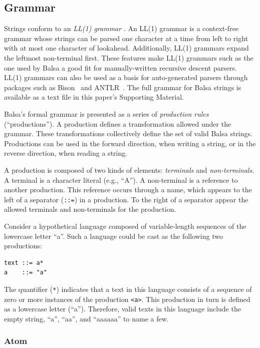 \documentclass{article}
\def\ttt{\texttt}
\begin{document}
\subsection*{Grammar}

Strings conform to an \textit{LL(1) grammar} \cite{thain:2020}. An LL(1) grammar is a context-free grammar whose strings can be parsed one character at a time from left to right with at most one character of lookahead. Additionally, LL(1) grammars expand the leftmost non-terminal first. These features make LL(1) grammars such as the one used by Balsa a good fit for manually-written recursive descent parsers. LL(1) grammars can also be used as a basis for auto-generated parsers through packages such as Bison~\cite{bison} and ANTLR~\cite{parr:2014}. The full grammar for Balsa strings is available as a text file in this paper's Supporting Material.

Balsa's formal grammar is presented as a series of \textit{production rules} (\enquote{productions}). A production defines a transformation allowed under the grammar. These transformations collectively define the set of valid Balsa strings. Productions can be used in the forward direction, when writing a string, or in the reverse direction, when reading a string. 

A production is composed of two kinds of elements: \textit{terminals} and \textit{non-terminals}. A terminal is a character literal (e.g., \enquote{A}). A non-terminal is a reference to another production. This reference occurs through a name, which appears to the left of a separator (\ttt{::=}) in a production. To the right of a separator appear the allowed terminals and non-terminals for the production.

Consider a hypothetical language composed of variable-length sequences of the lowercase letter \enquote{a}. Such a language could be cast as the following two productions:

\begin{lstlisting}
text ::= a*
a    ::= "a"
\end{lstlisting}

The quantifier (\ttt{*}) indicates that a text in this language consists of a sequence of zero or more instances of the production \ttt{<a>}. This production in turn is defined as a lowercase letter (\enquote{a}). Therefore, valid texts in this language include the empty string, \enquote{a}, \enquote{aa}, and \enquote{aaaaaa} to name a few.

\subsubsection*{Atom}
\end{document}
